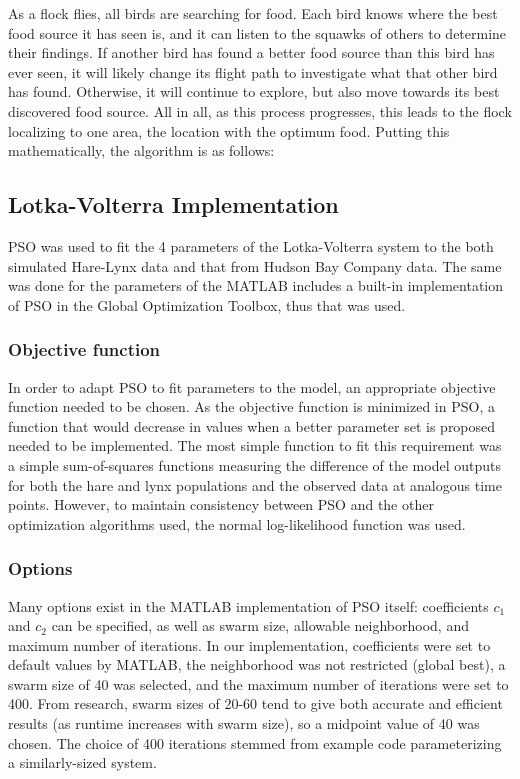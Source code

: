 \documentclass{article}
\begin{document}
As a flock flies, all birds are searching for food. Each bird knows where the best food source it has seen is, and it can listen to the squawks of others to determine their findings. If another bird has found a better food source than this bird has ever seen, it will likely change its flight path to investigate what that other bird has found. Otherwise, it will continue to explore, but also move towards its best discovered food source. All in all, as this process progresses, this leads to the flock localizing to one area, the location with the optimum food. Putting this mathematically, the algorithm is as follows:

\subsection{Lotka-Volterra Implementation}
PSO was used to fit the 4 parameters of the Lotka-Volterra system to the both simulated Hare-Lynx data and that from Hudson Bay Company data. The same was done for the parameters of the  MATLAB includes a built-in implementation of PSO in the Global Optimization Toolbox, thus that was used. 
\subsubsection{Objective function}
In order to adapt PSO to fit parameters to the model, an appropriate objective function needed to be chosen. As the objective function is minimized in PSO, a function that would decrease in values when a better parameter set is proposed needed to be implemented. The most simple function to fit this requirement was a simple sum-of-squares functions measuring the difference of the model outputs for both the hare and lynx populations and the observed data at analogous time points. However, to maintain consistency between PSO and the other optimization algorithms used, the normal log-likelihood function was used. 
\subsubsection{Options}
Many options exist in the MATLAB implementation of PSO itself: coefficients $c_{1}$ and $c_{2}$ can be specified, as well as swarm size, allowable neighborhood, and maximum number of iterations. In our implementation, coefficients were set to default values by MATLAB, the neighborhood was not restricted (global best), a swarm size of 40 was selected, and the maximum number of iterations were set to 400. From research, swarm sizes of 20-60 tend to give both accurate and efficient results (as runtime increases with swarm size), so a midpoint value of 40 was chosen. The choice of 400 iterations stemmed from example code parameterizing a similarly-sized system.
\end{document}
